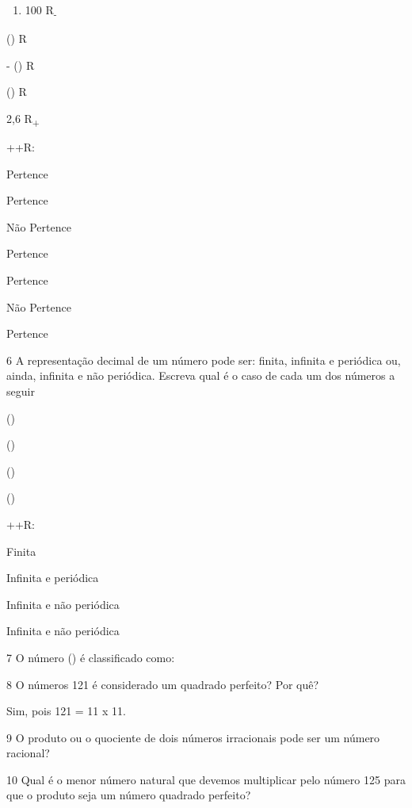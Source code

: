 \begin{enumerate}
\def\labelenumi{\alph{enumi})}
\setcounter{enumi}{2}
\tightlist
\item
  100 R\textsubscript{-}
\end{enumerate}
\item () R
\item - () R
\item () R
\item 2,6 R\textsubscript{+}

++R:
\item Pertence
\item Pertence
\item Não Pertence
\item Pertence
\item Pertence
\item Não Pertence
\item Pertence

\num{6} A representação decimal de um número pode ser: finita, infinita e
periódica ou, ainda, infinita e não periódica. Escreva qual é o caso de
cada um dos números a seguir
\item()
\item()
\item ()
\item ()

++R:
\item Finita
\item Infinita e periódica
\item Infinita e não periódica
\item Infinita e não periódica

\num{7} O número (\pi) é classificado como:


\num{8} O números 121 é considerado um quadrado perfeito? Por quê?

Sim, pois 121 = 11 x 11.

\num{9} O produto ou o quociente de dois números irracionais pode ser um
número racional?


\num{10} Qual é o menor número natural que devemos multiplicar pelo número
125 para que o produto seja um número quadrado perfeito?


